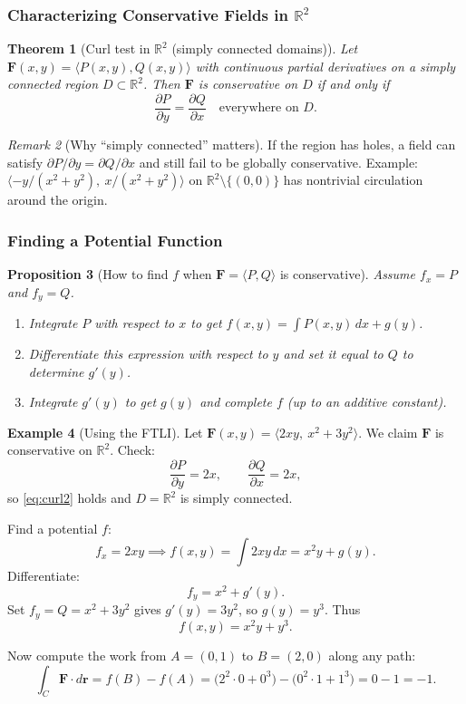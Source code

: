 \documentclass[12pt]{article}
\numberwithin{equation}{section}
\newcommand{\RR}{\mathbb{R}}
\newcommand{\vect}[1]{\boldsymbol{#1}}   %
\theoremstyle{plain}
\newtheorem{theorem}{Theorem}[section]
\newtheorem{proposition}[theorem]{Proposition}
\theoremstyle{definition}
\newtheorem{example}[theorem]{Example}
\theoremstyle{remark}
\newtheorem{remark}[theorem]{Remark}
\begin{document}
\subsubsection{Characterizing Conservative Fields in $\RR^2$}

\begin{theorem}[Curl test in $\RR^2$ (simply connected domains)]\label{thm:conservative-test}
Let $\vect F(x,y)=\langle P(x,y),Q(x,y)\rangle$ with continuous partial derivatives on a simply connected region $D\subset\RR^2$.  
Then $\vect F$ is conservative on $D$ if and only if
\begin{equation}\label{eq:curl2}
\frac{\partial P}{\partial y}=\frac{\partial Q}{\partial x}\quad \text{everywhere on }D.
\end{equation}
\end{theorem}

\begin{remark}[Why “simply connected” matters]
If the region has holes, a field can satisfy $\partial P/\partial y=\partial Q/\partial x$ and still fail to be globally conservative.  
Example: $\langle -y/(x^2+y^2),\ x/(x^2+y^2)\rangle$ on $\RR^2\setminus\{(0,0)\}$ has nontrivial circulation around the origin.
\end{remark}

\subsubsection{Finding a Potential Function}

\begin{proposition}[How to find $f$ when $\vect F=\langle P,Q\rangle$ is conservative]\label{prop:find-potential}
Assume $f_x=P$ and $f_y=Q$.
\begin{enumerate}[label=(\arabic*)]
\item Integrate $P$ with respect to $x$ to get $f(x,y)=\int P(x,y)\,dx + g(y)$.
\item Differentiate this expression with respect to $y$ and set it equal to $Q$ to determine $g'(y)$.
\item Integrate $g'(y)$ to get $g(y)$ and complete $f$ (up to an additive constant).
\end{enumerate}
\end{proposition}

\begin{example}[Using the FTLI]
Let $\vect F(x,y)=\langle 2xy,\ x^2+3y^2\rangle$. We claim $\vect F$ is conservative on $\RR^2$.
Check:
\[
\frac{\partial P}{\partial y}=2x,\qquad \frac{\partial Q}{\partial x}=2x,
\]
so \cref{eq:curl2} holds and $D=\RR^2$ is simply connected.

Find a potential $f$:
\[
f_x=2xy \implies f(x,y)=\int 2xy\,dx=x^2y+g(y).
\]
Differentiate:
\[
f_y=x^2+g'(y).
\]
Set $f_y=Q=x^2+3y^2$ gives $g'(y)=3y^2$, so $g(y)=y^3$. Thus
\[
f(x,y)=x^2y+y^3.
\]

Now compute the work from $A=(0,1)$ to $B=(2,0)$ along any path:
\[
\int_C \vect F\cdot d\vect r=f(B)-f(A)=\big(2^2\cdot 0+0^3\big)-\big(0^2\cdot 1+1^3\big)=0-1=-1.
\]
\end{example}
\end{document}
